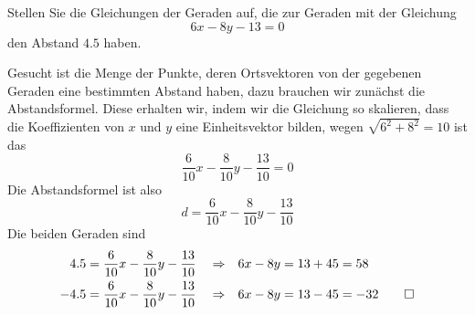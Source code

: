 Stellen Sie die Gleichungen der Geraden auf, die zur Geraden mit der
Gleichung
\[
6x-8y-13=0
\]
den Abstand $4.5$ haben.


\begin{loesung}
Gesucht ist die Menge der Punkte, deren Ortsvektoren von der gegebenen
Geraden eine bestimmten Abstand haben, dazu brauchen wir zunächst die
Abstandsformel. Diese erhalten wir, indem wir die Gleichung so skalieren,
dass die Koeffizienten von $x$ und $y$ eine Einheitsvektor bilden,
wegen $\sqrt{6^2+8^2}=10$ ist das
\[
\frac{6}{10}x-\frac{8}{10}y-\frac{13}{10}=0
\]
Die Abstandsformel ist also
\[
d =\frac{6}{10}x-\frac{8}{10}y-\frac{13}{10}
\]
Die beiden Geraden sind
\begin{align*}
4.5&=\frac{6}{10}x-\frac{8}{10}y-\frac{13}{10}&&\Rightarrow&
6x-8y&=13+45=58
\\
-4.5&=\frac{6}{10}x-\frac{8}{10}y-\frac{13}{10}&&\Rightarrow&
6x-8y&=13-45=-32
\qedhere
\end{align*}
\end{loesung}


